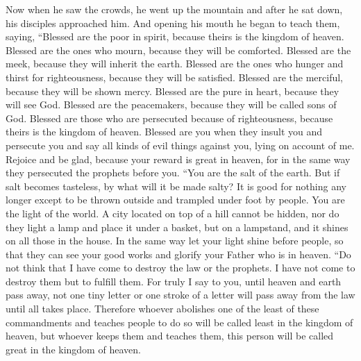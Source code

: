 \begin{biblechapter} %
 Now when he saw the crowds, he went up the mountain and after he sat down, his disciples approached him.
\verse And opening his mouth he began to teach them, saying,
\verse “Blessed are the poor in spirit, 
because theirs is the kingdom of heaven.
\verse Blessed are the ones who mourn, 
because they will be comforted.
\verse Blessed are the meek, 
because they will inherit the earth.
\verse Blessed are the ones who hunger and thirst for righteousness, 
because they will be satisfied.
\verse Blessed are the merciful, 
because they will be shown mercy.
\verse Blessed are the pure in heart, 
because they will see God.
\verse Blessed are the peacemakers, 
because they will be called sons of God.
\verse Blessed are those who are persecuted because of righteousness, 
because theirs is the kingdom of heaven.
\verse Blessed are you 
when they insult you and persecute you and say all kinds of evil things against you, lying on account of me.
\verse Rejoice and be glad, because your reward is great in heaven, for in the same way they persecuted the prophets before you.
 “You are the salt of the earth. But if salt becomes tasteless, by what will it be made salty? It is good for nothing any longer except to be thrown outside and trampled under foot by people.
\verse You are the light of the world. A city located on top of a hill cannot be hidden,
\verse nor do they light a lamp and place it under a basket, but on a lampstand, and it shines on all those in the house.
\verse In the same way let your light shine before people, so that they can see your good works and glorify your Father who is in heaven.
 “Do not think that I have come to destroy the law or the prophets. I have not come to destroy them but to fulfill them.
\verse For truly I say to you, until heaven and earth pass away, not one tiny letter or one stroke of a letter will pass away from the law until all takes place.
\verse Therefore whoever abolishes one of the least of these commandments and teaches people to do so will be called least in the kingdom of heaven, but whoever keeps them and teaches them, this person will be called great in the kingdom of heaven.

\end{biblechapter}
